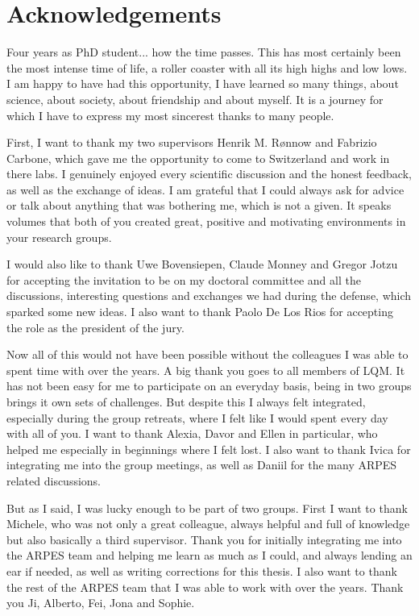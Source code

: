\chapter*{Acknowledgements}
Four years as PhD student... how the time passes.
This has most certainly been the most intense time of life, a roller coaster with all its high highs and low lows.
I am happy to have had this opportunity, I have learned so many things, about science, about society, about friendship and about myself.
It is a journey for which I have to express my most sincerest thanks to many people.\hfill\break

First, I want to thank my two supervisors Henrik M. R{\o}nnow and Fabrizio Carbone, which gave me the opportunity to come to Switzerland and work in there labs.
I genuinely enjoyed every scientific discussion and the honest feedback, as well as the exchange of ideas.
I am grateful that I could always ask for advice or talk about anything that was bothering me, which is not a given.
It speaks volumes that both of you created great, positive and motivating environments in your research groups.\hfill\break

I would also like to thank Uwe Bovensiepen, Claude Monney and Gregor Jotzu for accepting the invitation to be on my doctoral committee and all the discussions, interesting questions and exchanges we had during the defense, which sparked some new ideas.
I also want to thank Paolo De Los Rios for accepting the role as the president of the jury.\hfill\break

Now all of this would not have been possible without the colleagues I was able to spent time with over the years.
A big thank you goes to all members of LQM.
It has not been easy for me to participate on an everyday basis, being in two groups brings it own sets of challenges.
But despite this I always felt integrated, especially during the group retreats, where I felt like I would spent every day with all of you.
I want to thank Alexia, Davor and Ellen in particular, who helped me especially in beginnings where I felt lost.
I also want to thank Ivica for integrating me into the group meetings, as well as Daniil for the many ARPES related discussions.\hfill\break

But as I said, I was lucky enough to be part of two groups.
First I want to thank Michele, who was not only a great colleague, always helpful and full of knowledge but also basically a third supervisor.
Thank you for initially integrating me into the ARPES team and helping me learn as much as I could, and always lending an ear if needed, as well as writing corrections for this thesis. I also want to thank the rest of the ARPES team that I was able to work with over the years. Thank you Ji, Alberto, Fei, Jona and Sophie.

